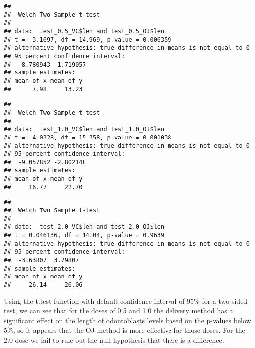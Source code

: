 \documentclass[
]{article}
\newenvironment{Shaded}{\begin{snugshade}}{\end{snugshade}}
\newcommand{\DataTypeTok}[1]{\textcolor[rgb]{0.13,0.29,0.53}{#1}}
\newcommand{\FloatTok}[1]{\textcolor[rgb]{0.00,0.00,0.81}{#1}}
\newcommand{\KeywordTok}[1]{\textcolor[rgb]{0.13,0.29,0.53}{\textbf{#1}}}
\newcommand{\NormalTok}[1]{#1}
\newcommand{\OperatorTok}[1]{\textcolor[rgb]{0.81,0.36,0.00}{\textbf{#1}}}
\newcommand{\StringTok}[1]{\textcolor[rgb]{0.31,0.60,0.02}{#1}}
\begin{document}
\begin{verbatim}
## 
##  Welch Two Sample t-test
## 
## data:  test_0.5_VC$len and test_0.5_OJ$len
## t = -3.1697, df = 14.969, p-value = 0.006359
## alternative hypothesis: true difference in means is not equal to 0
## 95 percent confidence interval:
##  -8.780943 -1.719057
## sample estimates:
## mean of x mean of y 
##      7.98     13.23
\end{verbatim}

\begin{Shaded}
\end{Shaded}

\begin{verbatim}
## 
##  Welch Two Sample t-test
## 
## data:  test_1.0_VC$len and test_1.0_OJ$len
## t = -4.0328, df = 15.358, p-value = 0.001038
## alternative hypothesis: true difference in means is not equal to 0
## 95 percent confidence interval:
##  -9.057852 -2.802148
## sample estimates:
## mean of x mean of y 
##     16.77     22.70
\end{verbatim}

\begin{Shaded}
\end{Shaded}

\begin{verbatim}
## 
##  Welch Two Sample t-test
## 
## data:  test_2.0_VC$len and test_2.0_OJ$len
## t = 0.046136, df = 14.04, p-value = 0.9639
## alternative hypothesis: true difference in means is not equal to 0
## 95 percent confidence interval:
##  -3.63807  3.79807
## sample estimates:
## mean of x mean of y 
##     26.14     26.06
\end{verbatim}

Using the t.test function with default confidence interval of 95\% for a
two sided test, we can see that for the doses of 0.5 and 1.0 the
delivery method has a significant effect on the length of odontoblasts
levels based on the p-values below 5\%, so it appears that the OJ method
is more effective for those doses. For the 2.0 dose we fail to rule out
the null hypothesis that there is a difference.
\end{document}
